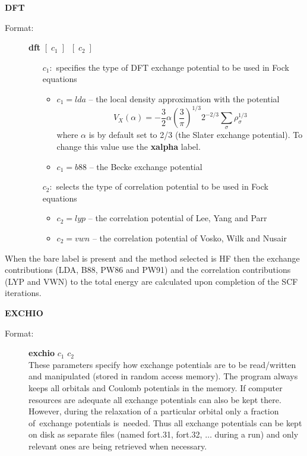 \documentclass[12pt,a4paper]{article}
\begin{document}
\begin{description}
\item \textbf{DFT}
\begin{description}
\item[Format:] \textbf{dft}  $[\;c_1\;]\;\; [\;c_2\;]$ \\
\begin{itemize}
\item[$c_1:$] specifies the type of DFT exchange potential to be used in
  Fock equations
\begin{itemize}
\item $c_1=lda$ -- the local density approximation with the potential
\begin{equation*}
         V_X(\alpha)=-\frac{3}{2} \alpha \left(\frac{3}{\pi}\right)^{1/3} 2^{-2/3}
                \sum_{\sigma} \rho_{\sigma}^{1/3}
\end{equation*}
where $\alpha$ is by default set to 2/3 (the Slater exchange
potential). To change this value use the \textbf{xalpha} label.

\item $c_1=b88$ -- the Becke exchange potential

\end{itemize}

\item[$c_2:$] selects the type of correlation potential to be used in
  Fock equations

\begin{itemize}
\item $c_2=lyp$ -- the correlation potential of Lee, Yang and Parr

\item $c_2=vwn$ -- the correlation potential of Vosko, Wilk and Nusair
\end{itemize}
\end{itemize}
\end{description}
When the bare label is present and the method selected is HF then the
exchange contributions (LDA, B88, PW86 and PW91) and the correlation
contributions (LYP and VWN) to the total energy are calculated upon
completion of the SCF iterations.

\item \textbf{EXCHIO}
\begin{description}
\item[Format:] \textbf{exchio} $c_1$ $c_2$\\ These parameters specify how exchange
  potentials are to be read/written and manipulated (stored in random access memory). The
  program always keeps all orbitals and Coulomb potentials in the memory. If computer
  resources are adequate all exchange potentials can also be kept there. However, during
  the relaxation of a particular orbital only a fraction of~exchange potentials
  is~needed. Thus all exchange potentials can be kept on disk as separate files (named
  fort.31, fort.32, $\ldots$ during a run) and only relevant ones are being retrieved when
  necessary.


\end{description}
\end{description}
\end{document}
